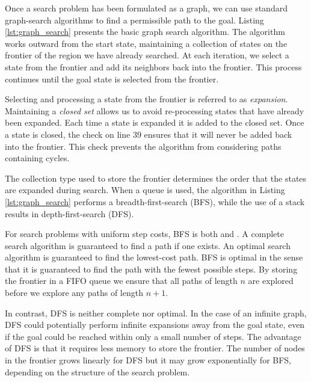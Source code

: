 Once a search problem has been formulated as a graph, we can use
standard graph-search algorithms to find a permissible path to the
goal.  Listing \ref{lst:graph_search} presents the basic graph search
algorithm. The algorithm works outward from the start state,
maintaining a collection of states on the frontier of the region we
have already searched.  At each iteration, we select a state from the
frontier and add its neighbors back into the frontier.  This process
continues until the goal state is selected from the frontier.

Selecting and processing a state from the frontier is referred to as
\emph{expansion}. Maintaining a \emph{closed set} allows us to avoid
re-processing states that have already been expanded.  Each time a
state is expanded it is added to the closed set.  Once a state is
closed, the check on line 39 ensures that it will never be added back
into the frontier.  This check prevents the algorithm from considering
paths containing cycles.

The collection type used to store the frontier determines the order
that the states are expanded during search.  When a queue is used, the
algorithm in Listing \ref{lst:graph_search} performs a
breadth-first-search (BFS), while the use of a stack results in
depth-first-search (DFS).

For search problems with uniform step costs, BFS is both
 and .  A complete search algorithm is
guaranteed to find a path if one exists.  An optimal search algorithm
is guaranteed to find the lowest-cost path.  BFS is optimal in the
sense that it is guaranteed to find the path with the fewest possible
steps.  By storing the frontier in a FIFO queue we ensure that all
paths of length $n$ are explored before we explore any paths of length
$n+1$.

In contrast, DFS is neither complete nor optimal. In the case of
an infinite graph, DFS could potentially perform infinite expansions
away from the goal state, even if the goal could be reached within only a
small number of steps.  The advantage of DFS is that it requires less
memory to store the frontier.  The number of nodes in the frontier
grows linearly for DFS but it may grow exponentially for BFS,
depending on the structure of the search problem.


